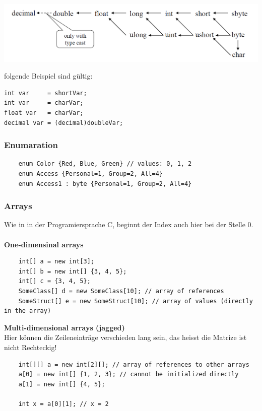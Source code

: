 \begin{minipage}{0.6\textwidth}
	\includegraphics[width=\textwidth]{images/CSharp/TypenKompatibilitaet}
\end{minipage}
\hspace{0.1\textwidth}
\begin{minipage}{0.3\textwidth}
	folgende Beispiel sind gültig:
	\begin{lstlisting}
int var     = shortVar;
int var     = charVar;
float var   = charVar;
decimal var = (decimal)doubleVar;
	\end{lstlisting}
\end{minipage}



\subsubsection{Enumaration}
\begin{lstlisting}
	enum Color {Red, Blue, Green} // values: 0, 1, 2
	enum Access {Personal=1, Group=2, All=4}
	enum Access1 : byte {Personal=1, Group=2, All=4}
\end{lstlisting}

\subsubsection{Arrays}
Wie in in der Programiersprache C, beginnt der Index auch hier bei der Stelle 0.\\ \\
\textbf{One-dimensinal arrays}
\begin{lstlisting}
	int[] a = new int[3];
	int[] b = new int[] {3, 4, 5};
	int[] c = {3, 4, 5};
	SomeClass[] d = new SomeClass[10]; // array of references
	SomeStruct[] e = new SomeStruct[10]; // array of values (directly in the array)
\end{lstlisting}

\textbf{Multi-dimensional arrays (jagged)}\\
Hier können die Zeileneinträge verschieden lang sein, das heisst die Matrize ist nicht Rechteckig!
\begin{lstlisting}
	int[][] a = new int[2][]; // array of references to other arrays
	a[0] = new int[] {1, 2, 3}; // cannot be initialized directly
	a[1] = new int[] {4, 5};
	
	int x = a[0][1]; // x = 2
\end{lstlisting}

